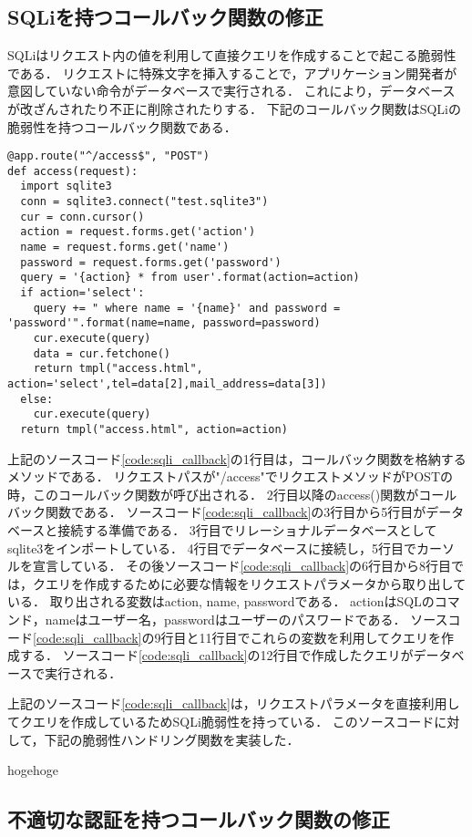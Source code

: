 \documentclass[a4paper,12pt]{jreport}
\begin{document}
\subsection{SQLiを持つコールバック関数の修正}
SQLiはリクエスト内の値を利用して直接クエリを作成することで起こる脆弱性である．
リクエストに特殊文字を挿入することで，アプリケーション開発者が意図していない命令がデータベースで実行される．
これにより，データベースが改ざんされたり不正に削除されたりする．
下記のコールバック関数はSQLiの脆弱性を持つコールバック関数である．
\begin{lstlisting}[caption={SQLi脆弱性を持つコールバック関数}, label=code:sqli_callback, captionpos=b]
@app.route("^/access$", "POST")
def access(request):
  import sqlite3
  conn = sqlite3.connect("test.sqlite3")
  cur = conn.cursor()
  action = request.forms.get('action')
  name = request.forms.get('name')
  password = request.forms.get('password')
  query = '{action} * from user'.format(action=action)
  if action='select':
    query += " where name = '{name}' and password = 'password'".format(name=name, password=password)
    cur.execute(query)
    data = cur.fetchone()
    return tmpl("access.html", action='select',tel=data[2],mail_address=data[3])
  else:
    cur.execute(query)
  return tmpl("access.html", action=action)
\end{lstlisting}
上記のソースコード\ref{code:sqli_callback}の1行目は，コールバック関数を格納するメソッドである．
リクエストパスが"/access"でリクエストメソッドがPOSTの時，このコールバック関数が呼び出される．
2行目以降のaccess()関数がコールバック関数である．
ソースコード\ref{code:sqli_callback}の3行目から5行目がデータベースと接続する準備である．
3行目でリレーショナルデータベースとしてsqlite3をインポートしている．
4行目でデータベースに接続し，5行目でカーソルを宣言している．
その後ソースコード\ref{code:sqli_callback}の6行目から8行目では，クエリを作成するために必要な情報をリクエストパラメータから取り出している．
取り出される変数はaction, name, passwordである．
actionはSQLのコマンド，nameはユーザー名，passwordはユーザーのパスワードである．
ソースコード\ref{code:sqli_callback}の9行目と11行目でこれらの変数を利用してクエリを作成する．
ソースコード\ref{code:sqli_callback}の12行目で作成したクエリがデータベースで実行される．

上記のソースコード\ref{code:sqli_callback}は，リクエストパラメータを直接利用してクエリを作成しているためSQLi脆弱性を持っている．
このソースコードに対して，下記の脆弱性ハンドリング関数を実装した．

hogehoge

\subsection{不適切な認証を持つコールバック関数の修正}
\end{document}
